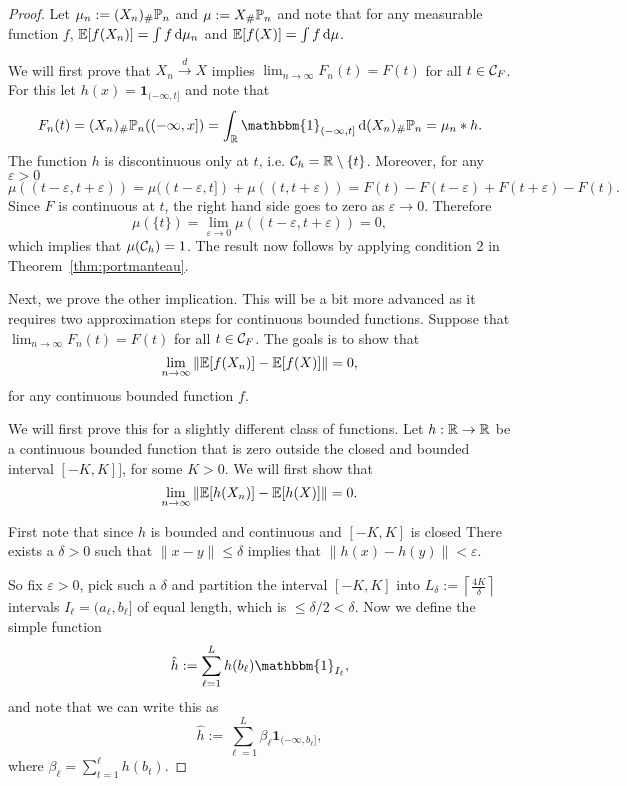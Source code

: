 \begin{proof}
Let $\mu_n := (X_n)_\# \mathbb P_n$ and $\mu :=  X_\# \mathbb P_n$ and note that for any measurable function $f$, $\mathbb E[f(X_n)] = \int f \, \mathrm{d} \mu_n$ and $\mathbb E[f(X)] = \int f \, \mathrm{d} \mu$.

We will first prove that $X_n \stackrel{d}{\rightarrow} X$ implies $\lim_{n \to \infty} F_n(t) = F(t)$ for all $t \in \mathcal C_F$. For this let $h(x) = \mathbf{1}_{(-\infty,t]}$ and note that 
\[
	F_n(t) = (X_n)_\# \bbP_n ((-\infty,x]) = \int_\bbR \mathbbm{1}_{(-\infty,t]} \, \dd (X_n)_\# \bbP_n
	= \mu_n \ast h.
\]
The function $h$ is discontinuous only at $t$, i.e. $\mathcal C_h = \mathbb R \setminus \{t\}$. Moreover, for any $\varepsilon > 0$
\[
	\mu((t-\varepsilon, t+\varepsilon)) = \mu((t-\varepsilon,t]) + \mu((t,t+\varepsilon))
	= F(t) - F(t-\varepsilon) + F(t + \varepsilon) - F(t).
\]
Since $F$ is continuous at $t$, the right hand side goes to zero as $\varepsilon \to 0$. Therefore
\[
	\mu(\{t\}) = \lim_{\varepsilon \to 0} \mu((t-\varepsilon, t+\varepsilon)) = 0,
\]
which implies that $\mu(\mathcal C_h) = 1$. The result now follows by applying condition 2 in Theorem~\ref{thm:portmanteau}.

Next, we prove the other implication. This will be a bit more advanced as it requires two approximation steps for continuous bounded functions. Suppose that  $\lim_{n \to \infty} F_n(t) = F(t)$ for all $t \in \mathcal C_F$. The goals is to show that
\[
	\lim_{n \to \infty} \|\mathbb E[f(X_n)] - \mathbb E[f(X)]\| = 0,
\]
for any continuous bounded function $f$.  

We will first prove this for a slightly different class of functions. Let $h : \mathbb R \to \mathbb R$ be a continuous bounded function that is zero outside the closed and bounded interval $[-K, K]]$, for some $K > 0$. We will first show that 
\begin{equation}\label{eq:conergence_distribution_1}
	\lim_{n \to \infty} \|\mathbb E[h(X_n)] - \mathbb E[h(X)]\| = 0.
\end{equation}

First note that since $h$ is bounded and continuous and $[-K,K]$ is closed There exists a $\delta > 0$ such that $\|x-y\| \le \delta$ implies that $\|h(x) - h(y)\| < \varepsilon$.

So fix $\varepsilon > 0$, pick such a $\delta$ and partition the interval $[-K,K]$ into $L_\delta := \left \lceil \frac{4K}{\delta} \right \rceil$ intervals $I_\ell = (a_\ell, b_\ell]$ of equal length, which is $\le \delta/2 < \delta$. Now we define the simple function
\[
	\hat{h} := \sum_{\ell = 1}^L h(b_\ell) \mathbbm{1}_{I_\ell},
\]
and note that we can write this as
\[
	\hat{h} := \sum_{\ell = 1}^L \beta_\ell \mathbf{1}_{(-\infty, b_\ell]},
\]
where $\beta_\ell = \sum_{t = 1}^\ell h(b_t)$. 


\end{proof}
